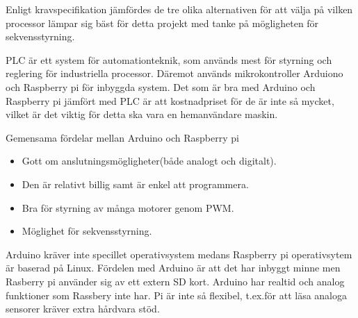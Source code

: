 Enligt kravspecifikation jämfördes de tre olika alternativen för att välja på vilken processor lämpar sig bäst för detta projekt med tanke på mögligheten för sekvensstyrning.

PLC är ett system för automationteknik, som används mest för styrning och reglering för industriella processor. Däremot används mikrokontroller Arduiono och Raspberry pi för inbyggda system. Det som är bra med Arduino och Raspberry pi jämfört med PLC är att kostnadpriset för de är inte så mycket, vilket är det viktig för detta ska vara en hemanvändare maskin.

Gemensama fördelar mellan Arduino och Raspberry pi
\begin{itemize}
	\item Gott om anslutningsmögligheter(både analogt och digitalt).
	\item Den är relativt billig samt är enkel att programmera.
	\item Bra för styrning av många motorer genom PWM.
	\item Möglighet för sekvensstyrning.
\end{itemize}

 Arduino kräver inte specillet operativsystem medans Raspberry pi operativsytem är baserad på Linux. Fördelen med  Arduino är att det har inbyggt minne men Rasberry pi använder sig av ett extern SD kort. Arduino har realtid och analog funktioner som Rassbery inte har. Pi är inte så flexibel, t.ex.för att läsa analoga sensorer kräver extra hårdvara stöd.

